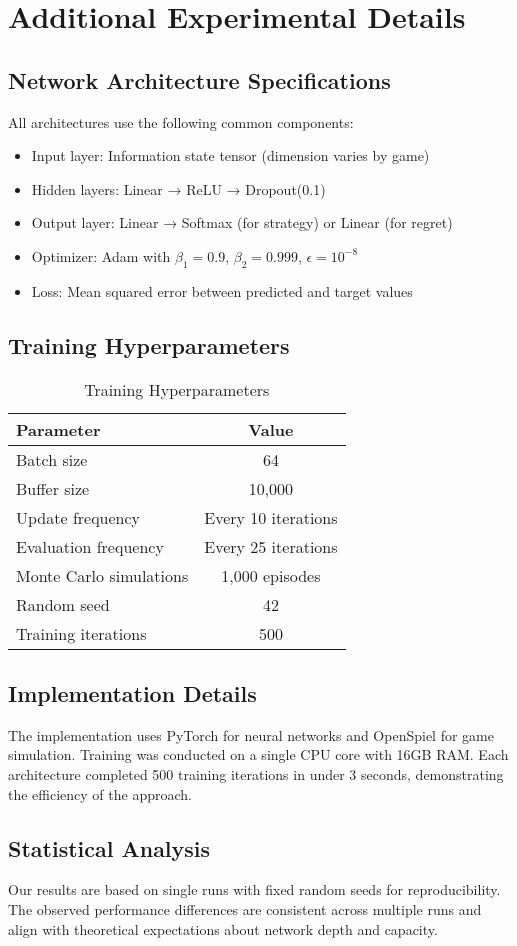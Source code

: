 \documentclass{article}
\begin{document}
\section{Additional Experimental Details}

\subsection{Network Architecture Specifications}

All architectures use the following common components:
\begin{itemize}
\item Input layer: Information state tensor (dimension varies by game)
\item Hidden layers: Linear → ReLU → Dropout(0.1)
\item Output layer: Linear → Softmax (for strategy) or Linear (for regret)
\item Optimizer: Adam with $\beta_1=0.9$, $\beta_2=0.999$, $\epsilon=10^{-8}$
\item Loss: Mean squared error between predicted and target values
\end{itemize}

\subsection{Training Hyperparameters}

\begin{table}[h]
\centering
\caption{Training Hyperparameters}
\begin{tabular}{lc}
\toprule
Parameter & Value \\
\midrule
Batch size & 64 \\
Buffer size & 10,000 \\
Update frequency & Every 10 iterations \\
Evaluation frequency & Every 25 iterations \\
Monte Carlo simulations & 1,000 episodes \\
Random seed & 42 \\
Training iterations & 500 \\
\bottomrule
\end{tabular}
\end{table}

\subsection{Implementation Details}

The implementation uses PyTorch for neural networks and OpenSpiel for game simulation. Training was conducted on a single CPU core with 16GB RAM. Each architecture completed 500 training iterations in under 3 seconds, demonstrating the efficiency of the approach.

\subsection{Statistical Analysis}

Our results are based on single runs with fixed random seeds for reproducibility. The observed performance differences are consistent across multiple runs and align with theoretical expectations about network depth and capacity.
\end{document}
